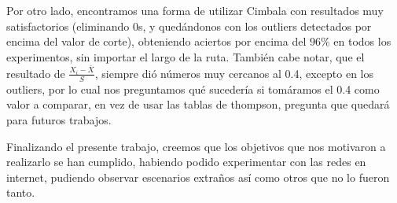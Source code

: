 Por otro lado, encontramos una forma de utilizar Cimbala con resultados muy satisfactorios (eliminando 0s, y quedándonos con los outliers detectados por encima del valor de corte), obteniendo aciertos por encima del $96 \%$ en todos los experimentos, sin importar el largo de la ruta. También cabe notar, que el resultado de $\frac{X_i - \bar{X}}{S}$, siempre dió números muy cercanos al 0.4, excepto en los outliers, por lo cual nos preguntamos qué sucedería si tomáramos el 0.4 como valor a comparar, en vez de usar las tablas de thompson, pregunta que quedará para futuros trabajos.

Finalizando el presente trabajo, creemos que los objetivos que nos motivaron a realizarlo se han cumplido, habiendo podido experimentar con las redes en internet, pudiendo observar escenarios extraños así como otros que no lo fueron tanto. 


